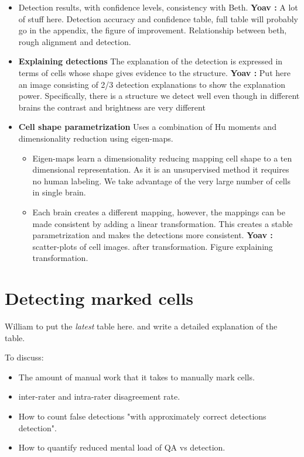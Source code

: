 \documentclass[runningheads]{llncs}
\newcommand{\comment}[3]{{\color{#1} {\bf #2 :} #3}}
\newcommand{\yoav}[1]{\comment{purple}{Yoav}{#1}}
\begin{document}
\begin{itemize}
    \item Detection results, with confidence levels, consistency with Beth.
    \yoav{A lot of stuff here. Detection accuracy and confidence table, full table will probably go in the appendix, the figure of improvement. Relationship between beth, rough alignment and detection.}
    \item {\bf Explaining detections} The explanation of the detection is expressed in terms of cells whose shape gives evidence to the structure.
    \yoav{Put here an image consisting of 2/3 detection explanations to show the explanation power. Specifically, there is a structure we detect well even though in different brains the contrast and brightness are very different}
\item {\bf Cell shape parametrization} Uses a combination of Hu moments and dimensionality reduction using eigen-maps.
\begin{itemize}
    \item Eigen-maps learn a dimensionality reducing mapping cell shape to a ten dimensional representation.
    As it is an unsupervised method it requires no human labeling. We take advantage of the very large number of cells in single brain. 
    \item Each brain creates a different mapping, however, the mappings can be made consistent by adding a linear transformation. This creates a stable parametrization and makes the detections more consistent.\yoav{scatter-plots of cell images. after transformation. Figure explaining transformation.}
\end{itemize}

\end{itemize}

\section{Detecting marked cells}

William to put the {\em latest} table here. and write a detailed
explanation of the table.

To discuss:
\begin{itemize}
\item The amount of manual work that it takes to manually mark cells.
\item inter-rater and intra-rater disagreement rate.
\item How to count false detections "with approximately correct
  detections detection".
\item How to quantify reduced mental load of QA vs detection.
\end{itemize}
\end{document}
